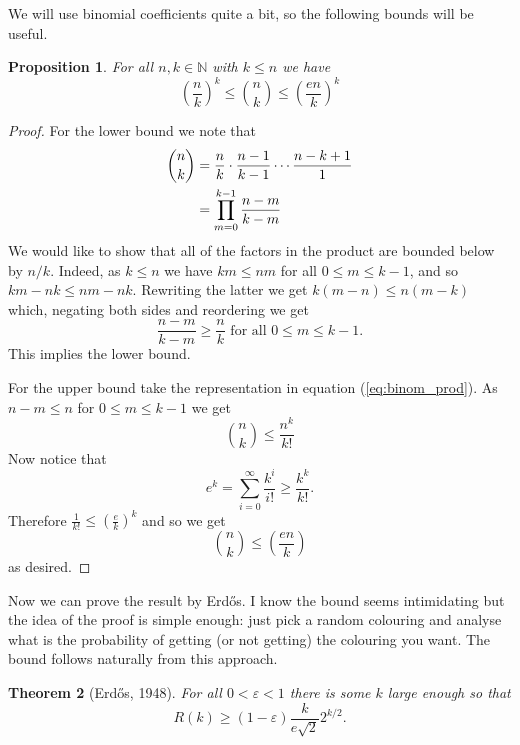 \documentclass{report}
\theoremstyle{definition}
\theoremstyle{plain}
\newtheorem{thm}{Theorem}
\newtheorem{prop}[thm]{Proposition}
\theoremstyle{definition}
\begin{document}
	We will use binomial coefficients quite a bit, so the following bounds will be useful.
	\begin{prop}\label{prop:binom_st_bound}
		For all $n,k\in\mathbb{N}$ with $k\leq n$ we have
		\[
		\left(\frac{n}{k}\right)^k \leq \binom{n}{k}\leq \left(\frac{en}{k}\right)^k
		\]
	\end{prop}
	\begin{proof}
		For the lower bound we note that
		\begin{align}
			\binom{n}{k} &= \frac{n}{k} \cdot \frac{n-1}{k-1} \cdots \frac{n-k+1}{1}\notag\\
			&= \prod_{m=0}^{k-1}\frac{n - m}{k-m} \label{eq:binom_prod}
		\end{align}
		We would like to show that all of the factors in the product are bounded below by $n/k$. Indeed, as $k\leq n$ we have $km \leq nm$ for all $0\leq m \leq k-1$, and so $km - nk \leq nm - nk$. Rewriting the latter we get $k(m - n)\leq n(m-k)$ which, negating both sides and reordering we get
		\[
		\frac{n-m}{k-m} \geq \frac{n}{k} \text{ for all }0\leq m \leq k-1.
		\]
		This implies the lower bound.
		
		For the upper bound take the representation in equation (\ref{eq:binom_prod}). As $n-m \leq n$ for $0\leq m\leq k-1$ we get 
		\begin{equation*}
			\binom{n}{k}\leq \frac{n^k}{k!}
		\end{equation*}
		Now notice that 
		\[
		e^k = \sum_{i=0}^{\infty} \frac{k^i}{i!} \geq \frac{k^k}{k!}.
		\]
		Therefore $\frac{1}{k!}\leq \left(\frac{e}{k}\right)^k$ and so we get
		\[
		\binom{n}{k} \leq \left(\frac{en}{k}\right)
		\]
		as desired.
	\end{proof}
	Now we can prove the result by Erdős. I know the bound seems intimidating but the idea of the proof is simple enough: just pick a random colouring and analyse what is the probability of getting (or not getting) the colouring you want. The bound follows naturally from this approach.
	\begin{thm}[Erdős, 1948]
		For all $0<\varepsilon < 1$ there is some $k$ large enough so that
		\[
			R(k) \geq (1 - \varepsilon) \frac{k}{e\sqrt{2}}2^{k/2}.
		\]
	\end{thm}
\end{document}
